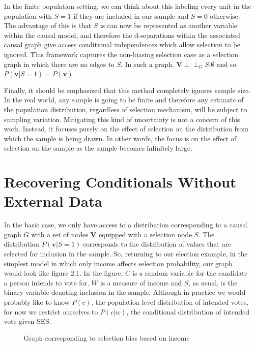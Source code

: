 \documentclass[12pt,twoside]{reedthesis}
\theoremstyle{definition}
\newcommand{\dsep}{\perp \!\!\!\perp}
\begin{document}
In the finite population setting, we can think about this labeling every unit in the population with  $S=1$ if they are included in our sample and $S= 0$ otherwise. The advantage of this is that $S$ is can now be represented as another variable within the causal model, and therefore the d-separations within the associated causal graph give access conditional independences which allow selection to be ignored. This framework captures the non-biasing selection case as a selection graph in which there are no edges to $S$. In such a graph, $\mathbf{V} \dsep_G S | \emptyset$ and so $P(\mathbf{v} | S = 1) = P(\mathbf{v})$.

Finally, it should be emphasized that this method completely ignores sample size. In the real world, any sample is going to be finite and therefore any estimate of the population distribution, regardless of selection mechanism, will be subject to sampling variation. Mitigating this kind of uncertainty is not a concern of this work. Instead, it focuses purely on the effect of selection on the distribution from which the sample is being drawn. In other words, the focus is on the effect of selection on the sample as the sample becomes infinitely large.


\section{Recovering Conditionals Without External Data}
In the basic case, we only have access to a distribution corresponding to a causal graph $G$  with a set of nodes $\mathbf{V}$ equipped with a selection node $S$. The distribution $P(\mathbf{v} | S = 1)$ corresponds to the distribution of values that are selected for inclusion in the sample. 
So, returning to our election example, in the simplest model in which only income affects selection probability, our graph would look like figure 2.1. In the figure, $C$ is a random variable for the candidate a person intends to vote for, $W$ is a measure of income and $S$, as usual, is the binary variable denoting inclusion in the sample. Although in practice we would probably like to know $P(c)$, the population level distribution of intended votes, for now we restrict ourselves to $P(c | w)$, the conditional distribution of intended vote given SES. 


\begin{figure}
\begin{center}
\end{center}
\caption{Graph corresponding to selection bias based on income} \label{fig:2.1}
\end{figure}
\end{document}
